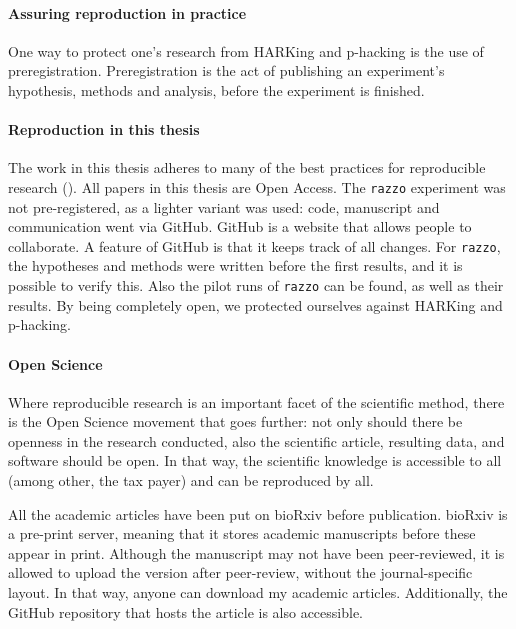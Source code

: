 \paragraph{Assuring reproduction in practice}

One way to protect one's research from HARKing and p-hacking
is the use of preregistration. Preregistration is the act of
publishing an experiment's hypothesis, methods and analysis,
before the experiment is finished. 

\paragraph{Reproduction in this thesis}

The work in this thesis adheres to many of the best 
practices for reproducible research (\cite{munafo2017manifesto}).
All papers in this thesis are Open Access.
The \verb;razzo; experiment was not pre-registered, as a lighter variant was used:
code, manuscript and communication went via GitHub. GitHub is a website that
allows people to collaborate. A feature of GitHub is that it keeps track
of all changes. For \verb;razzo;, the hypotheses and methods were written
before the first results, and it is possible to verify this.
Also the pilot runs of \verb;razzo; can be found, as well as their results.
By being completely open, we protected ourselves against HARKing and
p-hacking.

\paragraph{Open Science}

Where reproducible research is an important facet of the scientific method,
there is the Open Science movement that goes further: not only
should there be openness in the research conducted,
also the scientific article, resulting data, and software should be open.
In that way, the scientific knowledge is accessible to all (among other,
the tax payer) and can be reproduced by all. 

All the academic articles have been put on bioRxiv before publication.
bioRxiv is a pre-print server, meaning that it stores academic manuscripts
before these appear in print. Although the manuscript may not have been
peer-reviewed, it is allowed to upload the version after peer-review,
without the journal-specific layout. In that way, anyone can download
my academic articles. Additionally, the GitHub repository that hosts
the article is also accessible.

